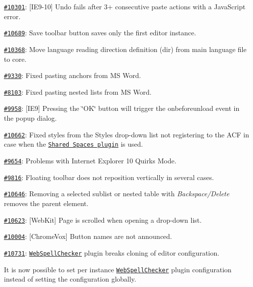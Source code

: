 {\ttfamily 
\begin{DoxyItemize}
\item \href{http://dev.ckeditor.com/ticket/10301}{\tt \#10301}\+: \mbox{[}I\+E9-\/10\mbox{]} Undo fails after 3+ consecutive paste actions with a Java\+Script error.
\item \href{http://dev.ckeditor.com/ticket/10689}{\tt \#10689}\+: Save toolbar button saves only the first editor instance.
\item \href{http://dev.ckeditor.com/ticket/10368}{\tt \#10368}\+: Move language reading direction definition ({\ttfamily dir}) from main language file to core.
\item \href{http://dev.ckeditor.com/ticket/9330}{\tt \#9330}\+: Fixed pasting anchors from MS Word.
\item \href{http://dev.ckeditor.com/ticket/8103}{\tt \#8103}\+: Fixed pasting nested lists from MS Word.
\item \href{http://dev.ckeditor.com/ticket/9958}{\tt \#9958}\+: \mbox{[}I\+E9\mbox{]} Pressing the \char`\"{}\+O\+K\char`\"{} button will trigger the {\ttfamily onbeforeunload} event in the popup dialog.
\item \href{http://dev.ckeditor.com/ticket/10662}{\tt \#10662}\+: Fixed styles from the Styles drop-\/down list not registering to the A\+CF in case when the \href{http://ckeditor.com/addon/sharedspace}{\tt Shared Spaces plugin} is used.
\item \href{http://dev.ckeditor.com/ticket/9654}{\tt \#9654}\+: Problems with Internet Explorer 10 Quirks Mode.
\item \href{http://dev.ckeditor.com/ticket/9816}{\tt \#9816}\+: Floating toolbar does not reposition vertically in several cases.
\item \href{http://dev.ckeditor.com/ticket/10646}{\tt \#10646}\+: Removing a selected sublist or nested table with {\itshape Backspace/\+Delete} removes the parent element.
\item \href{http://dev.ckeditor.com/ticket/10623}{\tt \#10623}\+: \mbox{[}Web\+Kit\mbox{]} Page is scrolled when opening a drop-\/down list.
\item \href{http://dev.ckeditor.com/ticket/10004}{\tt \#10004}\+: \mbox{[}Chrome\+Vox\mbox{]} Button names are not announced.
\item \href{http://dev.ckeditor.com/ticket/10731}{\tt \#10731}\+: \href{http://ckeditor.com/addon/wsc}{\tt Web\+Spell\+Checker} plugin breaks cloning of editor configuration.
\item It is now possible to set per instance \href{http://ckeditor.com/addon/wsc}{\tt Web\+Spell\+Checker} plugin configuration instead of setting the configuration globally.
\end{DoxyItemize}}

